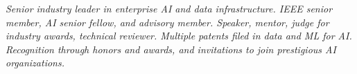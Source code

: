 {\selectfont
	\begin{justify}\textit{Senior industry leader in enterprise AI and data infrastructure. IEEE senior member, AI senior fellow, and advisory member. Speaker, mentor, judge for industry awards, technical reviewer. Multiple patents filed in data and ML for AI. Recognition through honors and awards, and invitations to join prestigious AI organizations.}\end{justify}
}